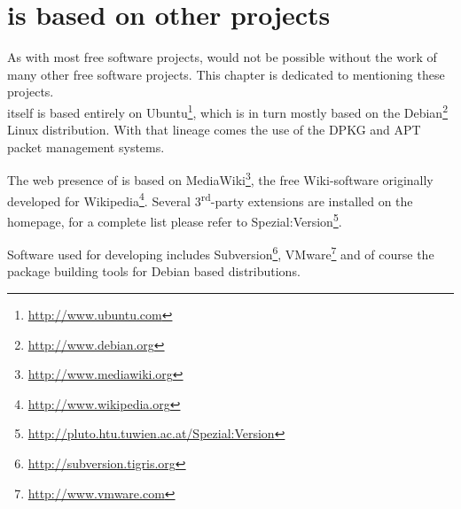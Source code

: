 \section{\tunix{} is based on other projects}
As with most free software projects, \tunix{} would not be possible without the
work of many other free software projects. This chapter is dedicated to
mentioning these projects.\\

\tunix{} itself is based entirely on Ubuntu\footnote{\href{http://www.ubuntu.com}%
{http://www.ubuntu.com}}, which is in turn mostly based on the Debian\footnote{%
\href{http://www.debian.org}{http://www.debian.org}} Linux distribution. With
that lineage comes the use of the DPKG and APT packet management systems.

The web presence of \tunix{} is based on MediaWiki\footnote{\href{%
http://www.mediawiki.org}{http://www.mediawiki.org}}, the free Wiki-software
originally developed for Wikipedia\footnote{\href{http://www.wikipedia.org}%
{http://www.wikipedia.org}}. Several 3\textsuperscript{rd}-party extensions are installed on
the \tunix{} homepage, for a complete list please refer to
Spezial:Version\footnote{\href{http://pluto.htu.tuwien.ac.at/Spezial:Version}{%
http://pluto.htu.tuwien.ac.at/Spezial:Version}}.

Software used for developing \tunix{} includes Subversion\footnote{\href{%
http://subversion.tigris.org}{http://subversion.tigris.org}},
VMware\footnote{\href{http://www.vmware.com}{http://www.vmware.com}} and of
course the package building tools for Debian based distributions.

